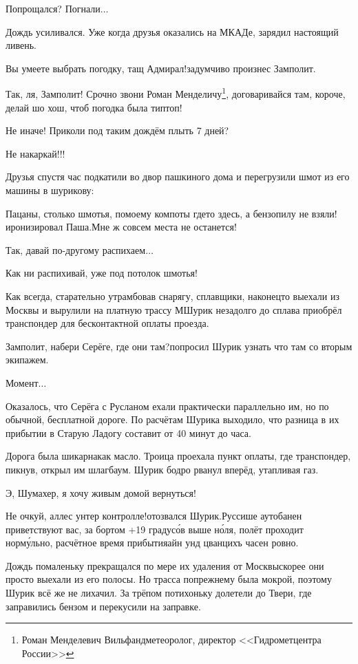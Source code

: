 \diagdash Попрощался? Погнали$\ldots$

Дождь усиливался. Уже когда друзья оказались на МКАДе, зарядил настоящий ливень.

\diagdash Вы умеете выбрать погодку, тащ Адмирал!\mdash задумчиво произнес Замполит. 

\diagdash Так, ля, Замполит! Срочно звони Роман Менделичу\footnote{Роман Менделевич Вильфанд\mdash метеоролог, директор <<Гидрометцентра России>>}, договаривайся там, короче, делай шо хош, чтоб погодка была тип\sdash топ!

\diagdash Не иначе! Приколи под таким дождём плыть 7 дней?

\diagdash Не накаркай!!!

Друзья спустя час подкатили во двор пашкиного дома и перегрузили шмот из его машины в шурикову:

\diagdash Пацаны, столько шмотья, по\sdash моему компоты где\sdash то здесь, а бензопилу не взяли!\mdash иронизировал Паша.\mdash Мне ж совсем места не останется!

\diagdash Так, давай по-другому распихаем$\ldots$

\diagdash Как ни распихивай, уже под потолок шмотья!

Как всегда, старательно утрамбовав снарягу, сплавщики, наконец\sdash то выехали из Москвы и вырулили на платную трассу М\mdash Шурик незадолго до сплава приобрёл транспондер для бесконтактной оплаты проезда.

\diagdash Замполит, набери Серёге, где они там?\mdash попросил Шурик узнать что там со вторым экипажем.

\diagdash Момент$\ldots$

Оказалось, что Серёга с Русланом ехали практически параллельно им, но по обычной, бесплатной дороге. По расчётам Шурика выходило, что разница в их прибытии в Старую Ладогу составит от 40 минут до часа.

Дорога была шикарна\mdash как масло. Троица проехала пункт оплаты, где транспондер, пикнув, открыл им шлагбаум. Шурик бодро рванул вперёд, утапливая газ. 

\diagdash Э, Шумахер, я хочу живым домой вернуться!

\diagdash Не очкуй, аллес унтер контролле!\mdash отозвался Шурик.\mdash Руссише аутобанен приветствуют вас, за бортом +19 градус\'{о}в выше н\'{о}ля, полёт проходит норм\'{у}льно, расчётное время прибытия\mdash айн унд цванцихъ часен ровно.

Дождь помаленьку прекращался по мере их удаления от Москвы\mdash скорее они просто выехали из его полосы. Но трасса по\sdash прежнему была мокрой, поэтому Шурик всё же не лихачил. За трёпом потихоньку долетели до Твери, где заправились бензом и перекусили на заправке.

